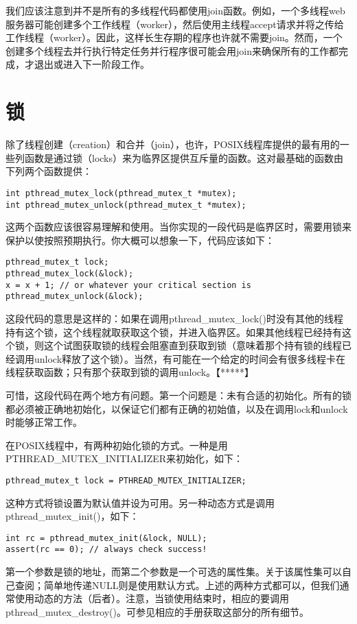 我们应该注意到并不是所有的多线程代码都使用join函数。例如，一个多线程web服务器可能创建多个工作线程（worker），然后使用主线程accept请求并将之传给工作线程（worker）。因此，这样长生存期的程序也许就不需要join。然而，一个创建多个线程去并行执行特定任务并行程序很可能会用join来确保所有的工作都完成，才退出或进入下一阶段工作。

\section{锁}
除了线程创建（creation）和合并（join），也许，POSIX线程库提供的最有用的一些列函数是通过锁（locks）来为临界区提供互斥量的函数。这对最基础的函数由下列两个函数提供：
\begin{verbatim}
int pthread_mutex_lock(pthread_mutex_t *mutex);
int pthread_mutex_unlock(pthread_mutex_t *mutex);
\end{verbatim}

这两个函数应该很容易理解和使用。当你实现的一段代码是临界区时，需要用锁来保护以使按照预期执行。你大概可以想象一下，代码应该如下：
\begin{verbatim}
pthread_mutex_t lock;
pthread_mutex_lock(&lock);
x = x + 1; // or whatever your critical section is
pthread_mutex_unlock(&lock);
\end{verbatim}

这段代码的意思是这样的：如果在调用pthread\_mutex\_lock()时没有其他的线程持有这个锁，这个线程就取获取这个锁，并进入临界区。如果其他线程已经持有这个锁，则这个试图获取锁的线程会阻塞直到获取到锁（意味着那个持有锁的线程已经调用unlock释放了这个锁）。当然，有可能在一个给定的时间会有很多线程卡在线程获取函数；只有那个获取到锁的调用unlock。【*****】

可惜，这段代码在两个地方有问题。第一个问题是：未有合适的初始化。所有的锁都必须被正确地初始化，以保证它们都有正确的初始值，以及在调用lock和unlock时能够正常工作。

在POSIX线程中，有两种初始化锁的方式。一种是用 PTHREAD\_MUTEX\_INITIALIZER来初始化，如下：
\begin{verbatim}
pthread_mutex_t lock = PTHREAD_MUTEX_INITIALIZER;
\end{verbatim}

这种方式将锁设置为默认值并设为可用。另一种动态方式是调用 pthread\_mutex\_init()，如下：
\begin{verbatim}
int rc = pthread_mutex_init(&lock, NULL);
assert(rc == 0); // always check success!
\end{verbatim}

第一个参数是锁的地址，而第二个参数是一个可选的属性集。关于该属性集可以自己查阅；简单地传递NULL则是使用默认方式。上述的两种方式都可以，但我们通常使用动态的方法（后者）。注意，当锁使用结束时，相应的要调用 pthread\_mutex\_destroy()。可参见相应的手册获取这部分的所有细节。

